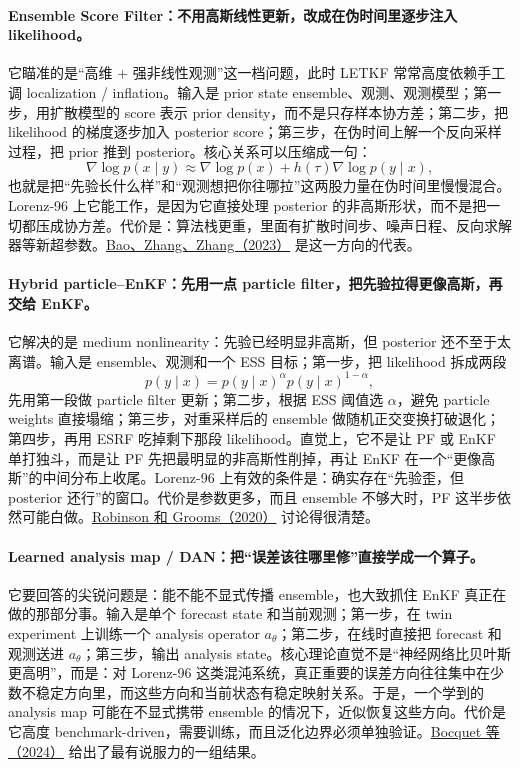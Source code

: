 \documentclass[12pt,a4paper]{ctexart}
\begin{document}
\paragraph{Ensemble Score Filter：不用高斯线性更新，改成在伪时间里逐步注入 likelihood。}
它瞄准的是“高维 + 强非线性观测”这一档问题，此时 LETKF 常常高度依赖手工调 localization / inflation。输入是 prior state ensemble、观测、观测模型；第一步，用扩散模型的 score 表示 prior density，而不是只存样本协方差；第二步，把 likelihood 的梯度逐步加入 posterior score；第三步，在伪时间上解一个反向采样过程，把 prior 推到 posterior。核心关系可以压缩成一句：
\[
\nabla \log p(x \mid y) \approx \nabla \log p(x) + h(\tau)\nabla \log p(y \mid x),
\]
也就是把“先验长什么样”和“观测想把你往哪拉”这两股力量在伪时间里慢慢混合。Lorenz-96 上它能工作，是因为它直接处理 posterior 的非高斯形状，而不是把一切都压成协方差。代价是：算法栈更重，里面有扩散时间步、噪声日程、反向求解器等新超参数。\href{https://arxiv.org/abs/2309.00983}{Bao、Zhang、Zhang（2023）} 是这一方向的代表。

\paragraph{Hybrid particle--EnKF：先用一点 particle filter，把先验拉得更像高斯，再交给 EnKF。}
它解决的是 medium nonlinearity：先验已经明显非高斯，但 posterior 还不至于太离谱。输入是 ensemble、观测和一个 ESS 目标；第一步，把 likelihood 拆成两段
\[
p(y \mid x) = p(y \mid x)^{\alpha} p(y \mid x)^{1-\alpha},
\]
先用第一段做 particle filter 更新；第二步，根据 ESS 阈值选 \(\alpha\)，避免 particle weights 直接塌缩；第三步，对重采样后的 ensemble 做随机正交变换打破退化；第四步，再用 ESRF 吃掉剩下那段 likelihood。直觉上，它不是让 PF 或 EnKF 单打独斗，而是让 PF 先把最明显的非高斯性削掉，再让 EnKF 在一个“更像高斯”的中间分布上收尾。Lorenz-96 上有效的条件是：确实存在“先验歪，但 posterior 还行”的窗口。代价是参数更多，而且 ensemble 不够大时，PF 这半步依然可能白做。\href{https://arxiv.org/abs/2006.04699}{Robinson 和 Grooms（2020）} 讨论得很清楚。

\paragraph{Learned analysis map / DAN：把“误差该往哪里修”直接学成一个算子。}
它要回答的尖锐问题是：能不能不显式传播 ensemble，也大致抓住 EnKF 真正在做的那部分事。输入是单个 forecast state 和当前观测；第一步，在 twin experiment 上训练一个 analysis operator \(a_\theta\)；第二步，在线时直接把 forecast 和观测送进 \(a_\theta\)；第三步，输出 analysis state。核心理论直觉不是“神经网络比贝叶斯更高明”，而是：对 Lorenz-96 这类混沌系统，真正重要的误差方向往往集中在少数不稳定方向里，而这些方向和当前状态有稳定映射关系。于是，一个学到的 analysis map 可能在不显式携带 ensemble 的情况下，近似恢复这些方向。代价是它高度 benchmark-driven，需要训练，而且泛化边界必须单独验证。\href{https://arxiv.org/abs/2408.04739}{Bocquet 等（2024）} 给出了最有说服力的一组结果。
\end{document}
